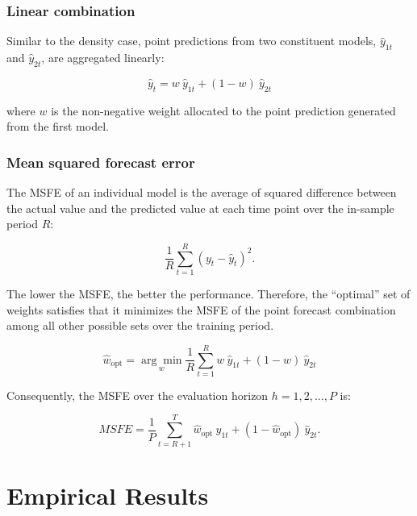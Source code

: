 \documentclass{monashthesis}
\begin{document}
\hypertarget{linear-combination}{%
\subsection{Linear combination}\label{linear-combination}}

Similar to the density case, point predictions from two constituent models, \(\hat y_{1t}\) and \(\hat y_{2t}\), are aggregated linearly:

\begin{equation}
\label{eqn:PC1}
\hat y_t = w \ \hat y_{1t} + (1-w) \ \hat y_{2t}
\end{equation}

where \(w\) is the non-negative weight allocated to the point prediction generated from the first model.

\hypertarget{mean-squared-forecast-error}{%
\subsection{Mean squared forecast error}\label{mean-squared-forecast-error}}

The MSFE of an individual model is the average of squared difference between the actual value and the predicted value at each time point over the in-sample period \(R\):

\begin{equation}
\label{eqn:MSFE1}
\frac{1}{R} \sum^R_{t=1} (y_t - \hat y_t)^2.
\end{equation}

The lower the MSFE, the better the performance. Therefore, the ``optimal'' set of weights satisfies that it minimizes the MSFE of the point forecast combination among all other possible sets over the training period.

\begin{equation}
\label{eqn:MSFE2}
\hat{w}_{\text{opt}} = \underset{w}{\arg\min} \frac{1}{R} \sum^R_{t=1} w \ \hat y_{1t} + (1-w) \ \hat y_{2t}
\end{equation}

Consequently, the MSFE over the evaluation horizon \(h = 1, 2, \dots, P\) is:

\begin{equation}
\label{eqn:MSFE3}
MSFE = \frac{1}{P} \sum^T_{t = R+1} \hat{w}_{\text{opt}} \ \hat y_{1t} + (1-\hat{w}_{\text{opt}}) \ \hat y_{2t}.
\end{equation}

\hypertarget{empirical-results}{%
\chapter{Empirical Results}\label{empirical-results}}
\end{document}
